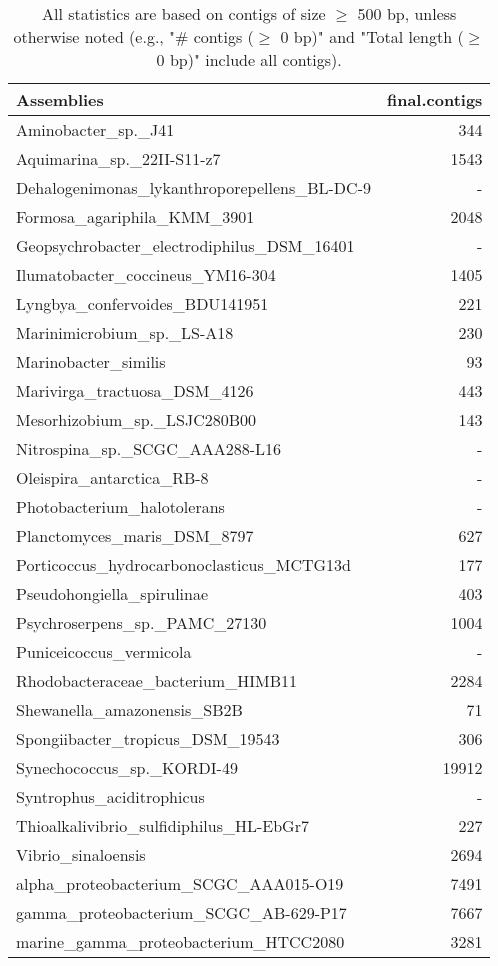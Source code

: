 \documentclass[12pt,a4paper]{article}
\begin{document}
\begin{table}[ht]
\begin{center}
\caption{All statistics are based on contigs of size $\geq$ 500 bp, unless otherwise noted (e.g., "\# contigs ($\geq$ 0 bp)" and "Total length ($\geq$ 0 bp)" include all contigs).}
\begin{tabular}{|l*{1}{|r}|}
\hline
Assemblies & final.contigs \\ \hline
Aminobacter\_sp.\_J41 & 344 \\ \hline
Aquimarina\_sp.\_22II-S11-z7 & 1543 \\ \hline
Dehalogenimonas\_lykanthroporepellens\_BL-DC-9 & - \\ \hline
Formosa\_agariphila\_KMM\_3901 & 2048 \\ \hline
Geopsychrobacter\_electrodiphilus\_DSM\_16401 & - \\ \hline
Ilumatobacter\_coccineus\_YM16-304 & 1405 \\ \hline
Lyngbya\_confervoides\_BDU141951 & 221 \\ \hline
Marinimicrobium\_sp.\_LS-A18 & 230 \\ \hline
Marinobacter\_similis & 93 \\ \hline
Marivirga\_tractuosa\_DSM\_4126 & 443 \\ \hline
Mesorhizobium\_sp.\_LSJC280B00 & 143 \\ \hline
Nitrospina\_sp.\_SCGC\_AAA288-L16 & - \\ \hline
Oleispira\_antarctica\_RB-8 & - \\ \hline
Photobacterium\_halotolerans & - \\ \hline
Planctomyces\_maris\_DSM\_8797 & 627 \\ \hline
Porticoccus\_hydrocarbonoclasticus\_MCTG13d & 177 \\ \hline
Pseudohongiella\_spirulinae & 403 \\ \hline
Psychroserpens\_sp.\_PAMC\_27130 & 1004 \\ \hline
Puniceicoccus\_vermicola & - \\ \hline
Rhodobacteraceae\_bacterium\_HIMB11 & 2284 \\ \hline
Shewanella\_amazonensis\_SB2B & 71 \\ \hline
Spongiibacter\_tropicus\_DSM\_19543 & 306 \\ \hline
Synechococcus\_sp.\_KORDI-49 & 19912 \\ \hline
Syntrophus\_aciditrophicus & - \\ \hline
Thioalkalivibrio\_sulfidiphilus\_HL-EbGr7 & 227 \\ \hline
Vibrio\_sinaloensis & 2694 \\ \hline
alpha\_proteobacterium\_SCGC\_AAA015-O19 & 7491 \\ \hline
gamma\_proteobacterium\_SCGC\_AB-629-P17 & 7667 \\ \hline
marine\_gamma\_proteobacterium\_HTCC2080 & 3281 \\ \hline
\end{tabular}
\end{center}
\end{table}
\end{document}
